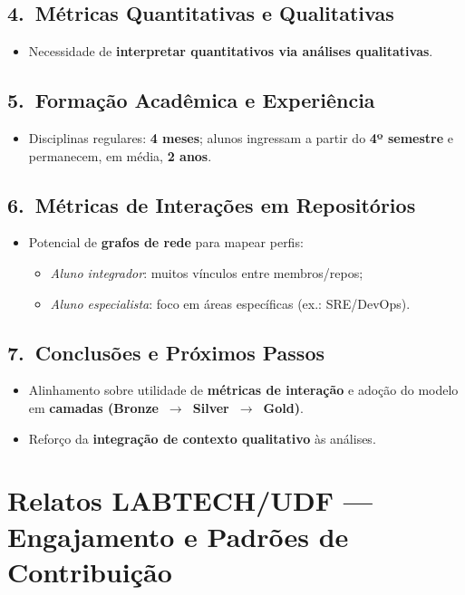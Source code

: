 \documentclass[
	12pt,
	openright,
	oneside,
	a4paper,
	brazil
]{abntex2}
\begin{document}
\begin{apendicesenv}
\section*{4.\ Métricas Quantitativas e Qualitativas}
\begin{itemize}
\item Necessidade de \textbf{interpretar quantitativos via análises qualitativas}.
\end{itemize}

\section*{5.\ Formação Acadêmica e Experiência}
\begin{itemize}
\item Disciplinas regulares: \textbf{4 meses}; alunos ingressam a partir do \textbf{4º semestre} e permanecem, em média, \textbf{2 anos}.
\end{itemize}

\section*{6.\ Métricas de Interações em Repositórios}
\begin{itemize}
\item Potencial de \textbf{grafos de rede} para mapear perfis:
\begin{itemize}
\item \textit{Aluno integrador}: muitos vínculos entre membros/repos;
\item \textit{Aluno especialista}: foco em áreas específicas (ex.: SRE/DevOps).
\end{itemize}
\end{itemize}

\section*{7.\ Conclusões e Próximos Passos}
\begin{itemize}
\item Alinhamento sobre utilidade de \textbf{métricas de interação} e adoção do modelo em \textbf{camadas (Bronze~$\rightarrow$~Silver~$\rightarrow$~Gold)}.
\item Reforço da \textbf{integração de contexto qualitativo} às análises.
\end{itemize}

\chapter{Relatos LABTECH/UDF --- Engajamento e Padrões de Contribuição}
\label{apendiceB}


\end{apendicesenv}
\end{document}
